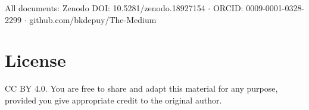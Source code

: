 \documentclass[11pt,letterpaper]{article}
\begin{document}
All documents: Zenodo DOI: 10.5281/zenodo.18927154 \(\cdot\) ORCID: 0009-0001-0328-2299 \(\cdot\) github.com/bkdepuy/The-Medium

\section{License}
\label{sec:org00ca507}

CC BY 4.0. You are free to share and adapt this material for any purpose, provided you give appropriate credit to the original author.
\end{document}
